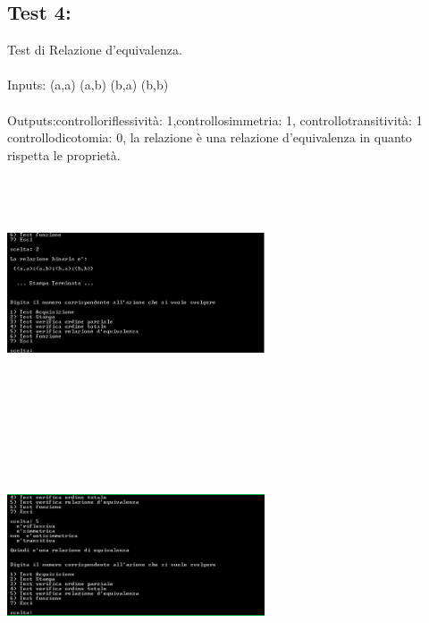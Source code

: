 \documentclass[11pt, a4paper, titlepage, block]{article}
\begin{document}
	\subsection{Test 4:}
	Test di Relazione d'equivalenza.\\
	\\
	Inputs: (a,a) (a,b) (b,a) (b,b) \\
	\\
	Outputs:controlloriflessivit\`a: 1,controllosimmetria: 1, controllotransitivit\`a: 1
	controllodicotomia: 0, la relazione \`e una relazione d'equivalenza in quanto rispetta le propriet\`a.\\
	\includegraphics[width=3in,height=3in,viewport=0 0 300 300]{../Screenshots/Test4Input.png}
	\\
	\includegraphics[width=3in,height=3in,viewport=0 0 300 300]{../Screenshots/Test4Output.png}
	\\
	\\
	\newpage
\end{document}
